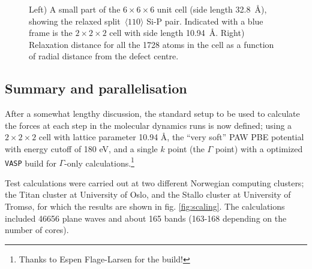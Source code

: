 \documentclass[11pt,bibliography=totoc,index=totoc]{scrbook}   %
\newcommand{\vasp}{{\texttt{VASP}}} %
\begin{document}
\begin{figure}[htbp]
  \centering
  \caption{Left) A small part of the $6\times 6\times 6$ unit cell (side length 32.8~Å), showing the 
  relaxed split~$\langle 110 \rangle$ Si-P pair.
  Indicated with a blue frame is the $2\times 2\times 2$ cell with side length 10.94~Å.
  Right) Relaxation distance for all the 1728 atoms in the cell as a function of radial distance from the defect centre.}
  \label{fig:tests/cellsize}
\end{figure}

%
\subsection{Summary and parallelisation}\label{sec:parameters:summary}
%

After a somewhat lengthy discussion, the standard setup to be used to calculate the forces at each step in the molecular dynamics runs is now defined; using a $2\times 2\times 2$ cell with lattice parameter 10.94 Å, the ``very soft'' PAW PBE potential with energy cutoff of 180 eV, and a single $k$ point (the $\Gamma$ point) with a optimized {\vasp} build for $\Gamma$-only calculations.\footnote{Thanks to Espen Flage-Larsen for the build!} 

Test calculations were carried out at two different Norwegian computing clusters; the Titan cluster at University of Oslo, 
and the Stallo cluster at University of Tromsø, for which the results are shown in fig. \ref{fig:scaling}.
The calculations included 46656 plane waves and about 165 bands (163-168 depending on the number of cores).


%
%
%
%
%
%
%
%
%
%
%
%
%
%
\end{document}
